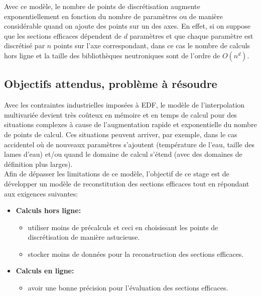 \hspace{0.5cm}
Avec ce modèle, le nombre de points de discrétisation augmente exponentiellement en fonction
du nombre de paramètres ou de manière considérable quand on ajoute des points sur un des axes.
En effet, si on suppose que les sections efficaces dépendent de $d$ paramètres et que chaque
paramètre est discrétisé par $n$ points sur l'axe correspondant, dans ce cas le nombre
de calculs hors ligne et la taille des bibliothèques neutroniques sont de l'ordre de $O(n^d)$.

\newpage
\subsection{Objectifs attendus, problème à résoudre}\label{sec:3.2}
\hspace{0.5cm}
Avec les contraintes industrielles imposées à EDF, le modèle de l'interpolation multivariée
devient très coûteux en mémoire et en temps de calcul pour des situations complexes à cause
de l'augmentation rapide et exponentielle du nombre de points de calcul.
Ces situations peuvent arriver, par exemple, dans le cas accidentel où de nouveaux
paramètres s'ajoutent (température de l'eau, taille des lames d'eau) et/ou quand le domaine
de calcul s'étend (avec des domaines de définition plus larges). \\

Afin de dépasser les limitations de ce modèle, l'objectif de ce stage est de développer
un modèle de reconstitution des sections efficaces tout en répondant aux exigences suivantes:
\begin{itemize}
		\item \textbf{Calculs hors ligne:}
		\begin{itemize}
				\item utiliser moins de précalculs et ceci en choisissant les points de discrétisation de manière astucieuse.
				\item stocker moins de données pour la reconstruction des sections efficaces.
		\end{itemize}

		\item \textbf{Calculs en ligne:} 
		\begin{itemize}
				\item avoir une bonne précision pour l'évaluation des sections efficaces.
		\end{itemize}

\end{itemize}

